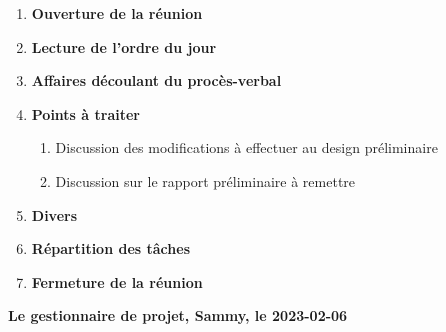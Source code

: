 \documentclass[12pt]{ULojpv}
\begin{document}
\entete
\begin{enumerate}
   \item \textbf{Ouverture de la réunion}
   \item \textbf{Lecture de l'ordre du jour}
   \item \textbf{Affaires découlant du procès-verbal}
   
   \item \textbf{Points à traiter}
      \begin{enumerate}
         \item Discussion des modifications à effectuer au design préliminaire
         \item Discussion sur le rapport préliminaire à remettre
      \end{enumerate}
   \item \textbf{Divers}
   \item \textbf{Répartition des tâches}

   \item \textbf{Fermeture de la réunion}
\end{enumerate}

\begin{flushright}
   \textbf{Le gestionnaire de projet, Sammy, le 2023-02-06}

\end{flushright}
\end{document}
